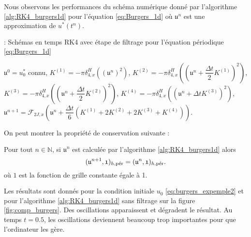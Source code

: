 Nous observons les performances du schéma numérique donné par l'algorithme \ref{alg:RK4_burgers1d} pour l'équation \eqref{eq:Burgers_1d} où $\mathfrak{u}^n$ est une approximation de $u^*(t^n)$.

\begin{center}
\begin{minipage}[H]{12cm}
  \begin{algorithm}[H]
    \caption{: Schémas en temps RK4 avec étape de filtrage pour l'équation périodique \eqref{eq:Burgers_1d}}\label{alg:RK4_burgers1d}
    \begin{algorithmic}[1]
    \State $\mathfrak{u}^0 = u_0^*$ connu,
             \State  $K^{(1)} = - \pi \delta_{4,x}^H \left(\left( \mathfrak{u}^n \right)^2\right)$,
             \State  $K^{(2)} = - \pi \delta_{4,x}^H \left(\left( \mathfrak{u}^n + \dfrac{\Delta t}{2} K^{(1)}\right)^2\right)$,
             \State  $K^{(3)} = - \pi \delta_{4,x}^H \left(\left( \mathfrak{u}^n + \dfrac{\Delta t}{2} K^{(2)}\right)^2\right)$,
             \State  $K^{(4)} = - \pi \delta_{4,x}^H \left(\left( \mathfrak{u}^n + \Delta t K^{(3)}\right)^2\right)$,  
             \State  $\mathfrak{u}^{n+1} = \mathcal{F}_{2J,x}\left( \mathfrak{u}^n  + \dfrac{\Delta t}{6} \left( K^{(1)} + 2 K^{(2)} + 2 K^{(3)} + K^{(4)} \right) \right)$.
            \EndFor
    \end{algorithmic}
    \end{algorithm}
\end{minipage}
\end{center}

On peut montrer la propriété de conservation suivante :
\begin{proposition}
Pour tout $n \in \mathbb{N}$, si $\mathfrak{u}^n$ est calculée par l'algorithme \ref{alg:RK4_burgers1d} alors
\begin{equation}
(\mathfrak{u}^{n+1}, \mathfrak{1})_{h,\per} = (\mathfrak{u}^n, \mathfrak{1})_{h,\per}.
\end{equation}
où $\mathfrak{1}$ est la fonction de grille constante égale à 1.
\end{proposition}

Les résultats sont donnés pour la condition initiale $u_0$ \eqref{eq:burgers_expemple2} et pour l'algorithme \ref{alg:RK4_burgers1d} sans filtrage sur la figure \ref{fig:comp_burgers}. Des oscillations apparaissent et dégradent le résultat. Au temps $t=0.5$, les oscillations deviennent beaucoup trop importantes pour que l'ordinateur les gère.

